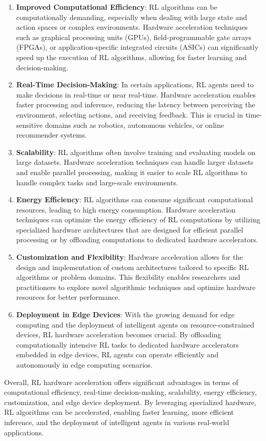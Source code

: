 \begin{enumerate}
	\item \textbf{Improved Computational Efficiency}: RL algorithms can be computationally demanding, especially when dealing with large state and action spaces or complex environments. Hardware acceleration techniques such as graphical processing units (GPUs), field-programmable gate arrays (FPGAs), or application-specific integrated circuits (ASICs) can significantly speed up the execution of RL algorithms, allowing for faster learning and decision-making.
	\item \textbf{Real-Time Decision-Making}: In certain applications, RL agents need to make decisions in real-time or near real-time. Hardware acceleration enables faster processing and inference, reducing the latency between perceiving the environment, selecting actions, and receiving feedback. This is crucial in time-sensitive domains such as robotics, autonomous vehicles, or online recommender systems.
	\item \textbf{Scalability}: RL algorithms often involve training and evaluating models on large datasets. Hardware acceleration techniques can handle larger datasets and enable parallel processing, making it easier to scale RL algorithms to handle complex tasks and large-scale environments.
	\item \textbf{Energy Efficiency}: RL algorithms can consume significant computational resources, leading to high energy consumption. Hardware acceleration techniques can optimize the energy efficiency of RL computations by utilizing specialized hardware architectures that are designed for efficient parallel processing or by offloading computations to dedicated hardware accelerators.
	\item \textbf{Customization and Flexibility}: Hardware acceleration allows for the design and implementation of custom architectures tailored to specific RL algorithms or problem domains. This flexibility enables researchers and practitioners to explore novel algorithmic techniques and optimize hardware resources for better performance.
	\item \textbf{Deployment in Edge Devices}: With the growing demand for edge computing and the deployment of intelligent agents on resource-constrained devices, RL hardware acceleration becomes crucial. By offloading computationally intensive RL tasks to dedicated hardware accelerators embedded in edge devices, RL agents can operate efficiently and autonomously in edge computing scenarios.
\end{enumerate}
Overall, RL hardware acceleration offers significant advantages in terms of computational efficiency, real-time decision-making, scalability, energy efficiency, customization, and edge device deployment. By leveraging specialized hardware, RL algorithms can be accelerated, enabling faster learning, more efficient inference, and the deployment of intelligent agents in various real-world applications.